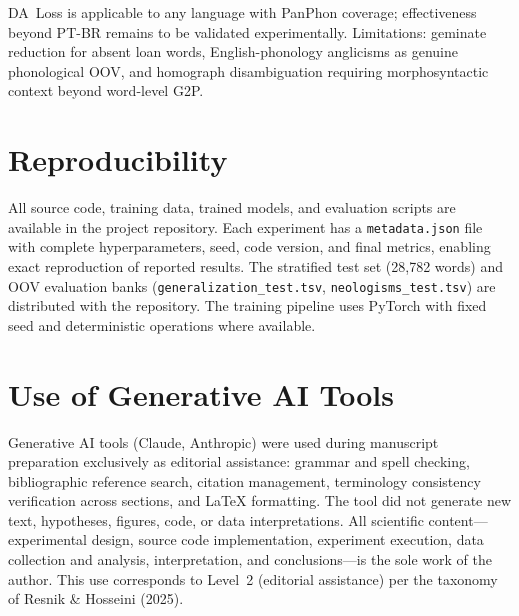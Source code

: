 \documentclass[conference]{IEEEtran}
\begin{document}
DA~Loss is applicable to any language with PanPhon coverage;
effectiveness beyond PT-BR remains to be validated experimentally.
Limitations: geminate reduction for absent loan words,
English-phonology anglicisms as genuine phonological OOV, and
homograph disambiguation requiring morphosyntactic context beyond
word-level G2P.

\section*{Reproducibility}

All source code, training data, trained models, and evaluation
scripts are available in the project repository.
Each experiment has a \texttt{metadata.json} file with complete
hyperparameters, seed, code version, and final metrics, enabling
exact reproduction of reported results.
The stratified test set (28{,}782 words) and OOV evaluation banks
(\texttt{generalization\_test.tsv}, \texttt{neologisms\_test.tsv})
are distributed with the repository.
The training pipeline uses PyTorch with fixed seed and deterministic
operations where available.

\section*{Use of Generative AI Tools}

Generative AI tools (Claude, Anthropic) were used during manuscript
preparation exclusively as editorial assistance: grammar and spell
checking, bibliographic reference search, citation management,
terminology consistency verification across sections, and \LaTeX{}
formatting.
The tool did not generate new text, hypotheses, figures, code, or
data interpretations.
All scientific content---experimental design, source code
implementation, experiment execution, data collection and analysis,
interpretation, and conclusions---is the sole work of the author.
This use corresponds to Level~2 (editorial assistance) per the
taxonomy of Resnik \& Hosseini (2025).



\end{document}
